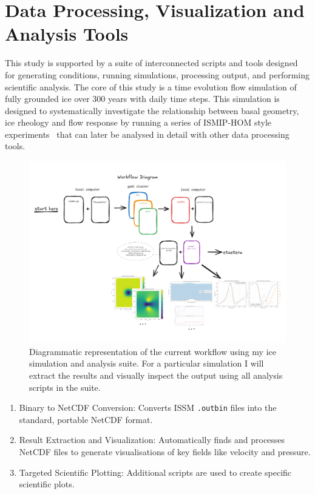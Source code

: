 \section{Data Processing, Visualization and Analysis Tools}\label{analysis_tools}
This study is supported by a suite of interconnected scripts and tools designed for generating conditions, running simulations, processing output, and performing scientific analysis.
The core of this study is a time evolution flow simulation of fully grounded ice over 300 years with daily time steps. This simulation is designed to systematically investigate the relationship between basal geometry, ice rheology and flow response by running a series of ISMIP-HOM style experiments~\cite{Pattyn_2008} that can later be analysed in detail with other data processing tools.
\begin{figure}[H]
    \includegraphics[scale=0.55]{figures/workflow_diagram.pdf}
    \caption{Diagrammatic representation of the current workflow using my ice simulation and analysis suite. For a particular simulation I will extract the results and visually inspect the output using  all analysis scripts in the suite.}\label{fig:workflow}
\end{figure}
\begin{enumerate}
\item{Binary to NetCDF Conversion}: Converts ISSM \texttt{.outbin} files into the standard, portable NetCDF format.
\item{Result Extraction and Visualization}: Automatically finds and processes NetCDF files to generate visualisations of key fields like velocity and pressure. 
\item{Targeted Scientific Plotting}: Additional scripts are used to create specific scientific plots.
\end{enumerate}
